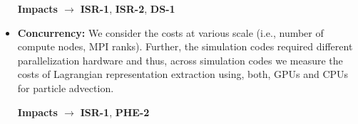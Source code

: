 \begin{itemize}
\textbf{Impacts $\rightarrow$} \textbf{ISR-1}, \textbf{ISR-2}, \textbf{DS-1}

\item \textbf{Concurrency:} We consider the costs at various scale (i.e., number of compute nodes, MPI ranks). Further, the simulation codes required different parallelization hardware and thus, across simulation codes we measure the costs of Lagrangian representation extraction using, both, GPUs and CPUs for particle advection.

\textbf{Impacts $\rightarrow$} \textbf{ISR-1}, \textbf{PHE-2}
\end{itemize}
